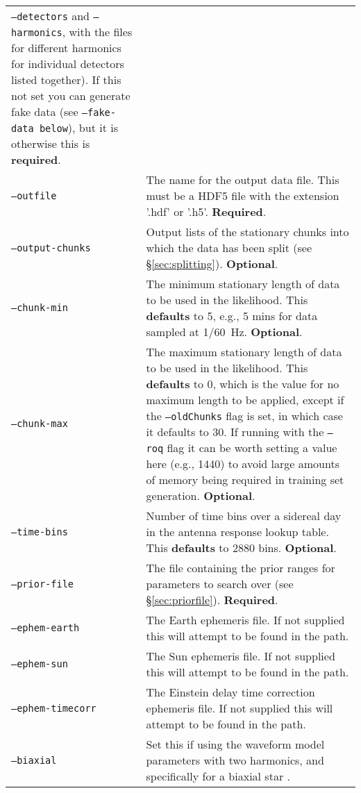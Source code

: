\begin{footnotesize}
\begin{longtable}{|p{}p{}|}
                            {\tt --detectors} and {\tt --harmonics}, with the files for different harmonics for individual detectors listed together). If this not
                            set you can generate fake data (see {\tt --fake-data below}), but it is otherwise this is {\bf required}. \\
 {\tt --outfile}         &  The name for the output data file. This must be a HDF5 file with the extension '.hdf' or '.h5'. {\bf Required}. \\
 {\tt --output-chunks}   &  Output lists of the stationary chunks into which the data has been split (see \S\ref{sec:splitting}). {\bf Optional}. \\
 {\tt --chunk-min}       &  The minimum stationary length of data to be used in the likelihood. This {\bf defaults} to 5, e.g., 5 mins for data
                            sampled at 1/60~Hz. {\bf Optional}. \\
 {\tt --chunk-max}       &  The maximum stationary length of data to be used in the likelihood. This {\bf defaults} to 0, which is the value for no
                            maximum length to be applied, except if the {\tt --oldChunks} flag is set, in which case it defaults to 30. If running with the
                            {\tt --roq} flag it can be worth setting a value here (e.g., 1440) to avoid large amounts of memory being required in training
                            set generation. {\bf Optional}. \\
 {\tt --time-bins}       &  Number of time bins over a sidereal day in the antenna response lookup table. This {\bf defaults} to 2880 bins. {\bf Optional}. \\
 {\tt --prior-file}      &  The file containing the prior ranges for parameters to search over (see \S\ref{sec:priorfile}). {\bf Required}. \\
 {\tt --ephem-earth}     &  The Earth ephemeris file. If not supplied this will attempt to be found in the path. \\
 {\tt --ephem-sun}       &  The Sun ephemeris file. If not supplied this will attempt to be found in the path. \\
 {\tt --ephem-timecorr}  &  The Einstein delay time correction ephemeris file. If not supplied this will attempt to be found in the path. \\
 {\tt --biaxial}         &  Set this if using the waveform model parameters with two harmonics, and specifically for a biaxial star \citep[see, e.g.,][]{2015MNRAS.453.4399P}. \\

\end{longtable}
\end{footnotesize}
